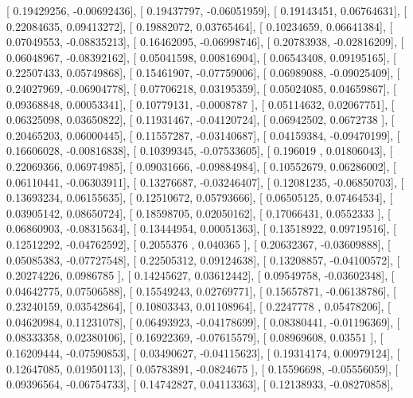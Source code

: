 \documentclass{article}
\begin{document}
       [ 0.19429256, -0.00692436],
       [ 0.19437797, -0.06051959],
       [ 0.19143451,  0.06764631],
       [ 0.22084635,  0.09413272],
       [ 0.19882072,  0.03765464],
       [ 0.10234659,  0.06641384],
       [ 0.07049553, -0.08835213],
       [ 0.16462095, -0.06998746],
       [ 0.20783938, -0.02816209],
       [ 0.06048967, -0.08392162],
       [ 0.05041598,  0.00816904],
       [ 0.06543408,  0.09195165],
       [ 0.22507433,  0.05749868],
       [ 0.15461907, -0.07759006],
       [ 0.06989088, -0.09025409],
       [ 0.24027969, -0.06904778],
       [ 0.07706218,  0.03195359],
       [ 0.05024085,  0.04659867],
       [ 0.09368848,  0.00053341],
       [ 0.10779131, -0.0008787 ],
       [ 0.05114632,  0.02067751],
       [ 0.06325098,  0.03650822],
       [ 0.11931467, -0.04120724],
       [ 0.06942502,  0.0672738 ],
       [ 0.20465203,  0.06000445],
       [ 0.11557287, -0.03140687],
       [ 0.04159384, -0.09470199],
       [ 0.16606028, -0.00816838],
       [ 0.10399345, -0.07533605],
       [ 0.196019  ,  0.01806043],
       [ 0.22069366,  0.06974985],
       [ 0.09031666, -0.09884984],
       [ 0.10552679,  0.06286002],
       [ 0.06110441, -0.06303911],
       [ 0.13276687, -0.03246407],
       [ 0.12081235, -0.06850703],
       [ 0.13693234,  0.06155635],
       [ 0.12510672,  0.05793666],
       [ 0.06505125,  0.07464534],
       [ 0.03905142,  0.08650724],
       [ 0.18598705,  0.02050162],
       [ 0.17066431,  0.0552333 ],
       [ 0.06860903, -0.08315634],
       [ 0.13444954,  0.00051363],
       [ 0.13518922,  0.09719516],
       [ 0.12512292, -0.04762592],
       [ 0.2055376 ,  0.040365  ],
       [ 0.20632367, -0.03609888],
       [ 0.05085383, -0.07727548],
       [ 0.22505312,  0.09124638],
       [ 0.13208857, -0.04100572],
       [ 0.20274226,  0.0986785 ],
       [ 0.14245627,  0.03612442],
       [ 0.09549758, -0.03602348],
       [ 0.04642775,  0.07506588],
       [ 0.15549243,  0.02769771],
       [ 0.15657871, -0.06138786],
       [ 0.23240159,  0.03542864],
       [ 0.10803343,  0.01108964],
       [ 0.2247778 ,  0.05478206],
       [ 0.04620984,  0.11231078],
       [ 0.06493923, -0.04178699],
       [ 0.08380441, -0.01196369],
       [ 0.08333358,  0.02380106],
       [ 0.16922369, -0.07615579],
       [ 0.08969608,  0.03551   ],
       [ 0.16209444, -0.07590853],
       [ 0.03490627, -0.04115623],
       [ 0.19314174,  0.00979124],
       [ 0.12647085,  0.01950113],
       [ 0.05783891, -0.0824675 ],
       [ 0.15596698, -0.05556059],
       [ 0.09396564, -0.06754733],
       [ 0.14742827,  0.04113363],
       [ 0.12138933, -0.08270858],
\end{document}
